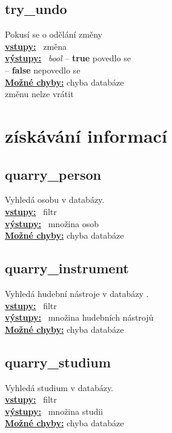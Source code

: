 \documentclass[a4paper, 11pt, twocolumn]{article}
\begin{document}
\subsection{try\_undo}
\vspace*{-0.3cm}
Pokusí se o odělání změny \\
\noindent \underline{\textbf{vstupy:}} \, změna  \\
\noindent \underline{\textbf{výstupy:}} \, \textit{bool} -- \textbf{true} povedlo se \\
\hspace*{2.35cm} -- \textbf{false} nepovedlo se  \\
\underline{\textbf{Možné chyby:}} chyba databáze \\
\hspace*{1.4cm} změnu nelze vrátit\\


\section{získávání informací}


\subsection{quarry\_person}
\vspace*{-0.3cm}
Vyhledá osobu v databázy. \\
\noindent \underline{\textbf{vstupy:}} \, filtr  \\
\noindent \underline{\textbf{výstupy:}} \, množina osob \\
\underline{\textbf{Možné chyby:}} chyba databáze \\

\subsection{quarry\_instrument}
\vspace*{-0.3cm}
Vyhledá hudební nástroje v databázy . \\
\noindent \underline{\textbf{vstupy:}} \, filtr \\
\noindent \underline{\textbf{výstupy:}} \, množina hudebních nástrojů\\
\underline{\textbf{Možné chyby:}} chyba databáze \\

\subsection{quarry\_studium}
\vspace*{-0.3cm}
Vyhledá studium v databázy. \\
\noindent \underline{\textbf{vstupy:}} \,  filtr \\
\noindent \underline{\textbf{výstupy:}} \, množina studii \\
\underline{\textbf{Možné chyby:}} chyba databáze \\
\end{document}
